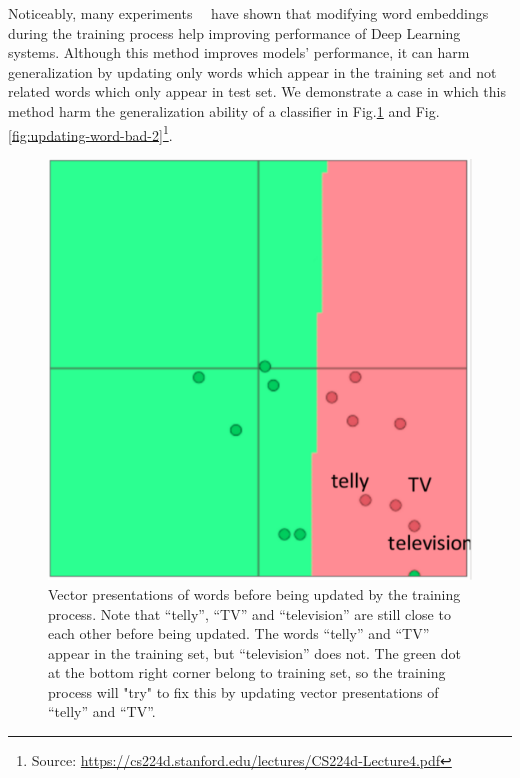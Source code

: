 Noticeably, many experiments~\cite{treeLSTM}~\cite{KimCNN} have shown that modifying word embeddings during the training process help improving performance of Deep Learning systems.
Although this method improves models' performance, it can harm generalization by updating only words which appear in the training set and not related words which only appear in test set.
We demonstrate a case in which this method harm the generalization ability of a classifier in Fig.\ref{fig:updating-word-bad-1} and Fig.\ref{fig:updating-word-bad-2}\footnote{Source: \url{https://cs224d.stanford.edu/lectures/CS224d-Lecture4.pdf}}.


\begin{figure}[H]
    \centering
    \includegraphics[scale=0.35]{figure/vec-before-update}
    \caption[Word embeddings updating causing over-fitting 1]{Vector presentations of words before being updated by the training process.
    Note that ``telly'', ``TV'' and ``television'' are still close to each other before being updated.
    The words ``telly'' and ``TV'' appear in the training set, but ``television'' does not.
    The green dot at the bottom right corner belong to training set, so the training process will "try" to fix this by updating vector presentations of ``telly'' and ``TV''.
     }
    \label{fig:updating-word-bad-1}
\end{figure}

